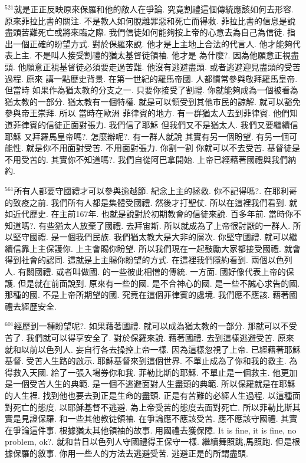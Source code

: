 \documentclass{book}
\begin{document}
$^{521}$就是正正反映原來保羅和他的敵人在爭論.
究竟割禮這個傳統應該如何去形容.
原來菲拉比書的關注.
不是教人如何脫離罪惡和死亡而得救.
菲拉比書的信息是說盡頭苦難死亡或將來臨之際.
我們信徒如何能夠按上帝的心意去為自己為信徒.
指出一個正確的盼望方式.
對於保羅來說.
他才是上主地上合法的代言人.
他才能夠代表上主.
不是叫人接受割禮的猶太基督徒領袖.
他才是 為什麼?.
因為他願意正視盡頭.
他願意正視基督徒必須要走過苦難.
他沒有逃避盡頭.
或者逃避迎見盡頭的受苦過程.
原來 講一點歷史背景.
在第一世紀的羅馬帝國.
人都慣常參與敬拜羅馬皇帝.
但當時 如果作為猶太教的分支之一.
只要你接受了割禮.
你就能夠成為一個被看為猶太教的一部分.
猶太教有一個特權.
就是可以領受到其他市民的諒解.
就可以豁免參與帝王崇拜.
所以 當時在歐洲 菲律賓的地方.
有一群猶太人去到菲律賓.
他們知道菲律賓的信徒正面對張力.
我們信了耶穌 但我們又不是猶太人.
我們又要繼續信耶穌 又拜羅馬皇帝嗎?.
怎麼辦呢?.
有一群人就說 其實有另一個盼望.
有另一個可能性.
就是你不用面對受苦.
不用面對張力.
你割一割 你就可以不去受苦.
基督徒是不用受苦的.
其實你不知道嗎?.
我們自從阿巴拿開始.
上帝已經藉著國禮與我們納約.

$^{561}$所有人都要守國禮才可以參與逾越節.
紀念上主的拯救.
你不記得嗎?.
在耶利哥的致疫之前.
我們所有人都是集體受國禮.
然後才打聖仗.
所以在這裡我們看到.
就如近代歷史.
在主前167年.
也就是說對於初期教會的信徒來說.
百多年前.
當時你不知道嗎?.
有些猶太人放棄了國禮.
去拜宙斯.
所以就成為了上帝很討厭的一群人.
所以堅守國禮.
是一個我們民族.
我們猶太教大是大非的層次.
你堅守國禮.
就可以繼續信靠上主保護你.
上主會賜你盼望.
所以我們現在一起鼓勵大家都接受國禮.
就會得到社會的認同.
這就是上主賜你盼望的方式.
在這裡我們隱約看到.
兩個以色列人.
有關國禮.
或者叫做國.
的一些彼此相憎的傳統.
一方面.
國好像代表上帝的保護.
但是就在前面說到.
原來有一些的國.
是不合神心的國.
是一些不誠心求告的國.
那種的國.
不是上帝所期望的國.
究竟在這個菲律賓的處境.
我們應不應該.
藉著國禮去經歷安全.

$^{601}$經歷到一種盼望呢?.
如果藉著國禮.
就可以成為猶太教的一部分.
那就可以不受苦了.
我們就可以得享安全了.
對於保羅來說.
藉著國禮.
去到這樣逃避受苦.
原來就和以前以色列人.
妄自行各去操控上帝一樣.
因為這樣忽視了上帝.
已經藉著耶穌基督.
受苦人生路的啟示.
耶穌基督來到這個世界.
不單止成為了你和我的救主.
為得救入天國.
給了一張入場券你和我.
菲勒比斯的耶穌.
不單止是一個救主.
他更加是一個受苦人生的典範.
是一個不逃避面對人生盡頭的典範.
所以保羅就是在耶穌的人生裡.
找到他也要去到正是生命的盡頭.
正是有苦難的必經人生過程.
以這種面對死亡的態度.
以耶穌基督不逃避.
為上帝受苦的態度去面對死亡.
所以菲勒比斯其實是見證保羅.
和一些其他教徒領袖.
在爭論應不應該受苦.
應不應該守國禮.
其實在爭論這件事.
根據猶太其他領袖的故事.
用國禮去獲保障.
It is fine, it is fine, no problem, ok?.
就和昔日以色列人守國禮得王保守一樣.
繼續舞照跳,馬照跑.
但是根據保羅的敘事.
你用一些人的方法去逃避受苦.
逃避正是的所謂盡頭.
\end{document}
